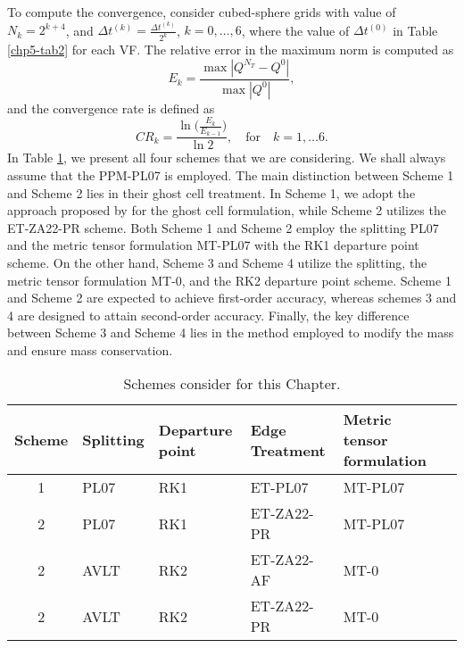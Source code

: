 To compute the convergence, consider cubed-sphere grids with value of $N_k =  2^{k+4}$,
and $\Delta t^{(k)} = \frac{\Delta t^{(k)}}{2^k}$, $k=0, \ldots, 6$, where
the value of $\Delta t^{(0)}$ in Table \ref{chp5-tab2} for each VF.
The relative error in the maximum norm is computed as
\begin{equation}
	E_k = \frac{\max |Q^{N_T} - Q^0|}{\max {|Q^0|}},
\end{equation}
and the convergence rate is defined as
\begin{equation*}
	CR_k = \frac{\ln{\bigg(\frac{E_{k}}{E_{k-1}}}\bigg)}{\ln 2}, \quad \text{for} \quad k = 1, \ldots 6.
\end{equation*}
In Table \ref{chp5-tab3}, we present all four schemes that we are considering. 
We shall always assume that the PPM-PL07 is employed. 
The main distinction between Scheme 1 and Scheme 2 lies in their ghost cell treatment.
In Scheme 1, we adopt the approach proposed by \citet{putman:2007} for the ghost cell formulation,
while Scheme 2 utilizes the ET-ZA22-PR scheme.
Both Scheme 1 and Scheme 2 employ the splitting PL07 and the metric tensor formulation MT-PL07 
with the RK1 departure point scheme. On the other hand, Scheme 3 and Scheme 4 utilize the splitting,
the metric tensor formulation MT-0, and the RK2 departure point scheme.
Scheme 1 and Scheme 2 are expected to achieve first-order accuracy, whereas schemes 3 and 4 are designed
to attain second-order accuracy. Finally, the key difference between Scheme 3 and Scheme 4 lies in the method employed to modify the mass and ensure mass conservation.
\begin{table}[!ht]
	\begin{tabular}{|c|l|l|l|l|l|}
		\hline
		Scheme & Splitting & Departure point & Edge Treatment & Metric tensor formulation\\ \hline
		1   & PL07 & RK1 & ET-PL07 & MT-PL07\\ \hline
		2   & PL07 & RK1 & ET-ZA22-PR & MT-PL07\\ \hline
		2   & AVLT & RK2 & ET-ZA22-AF & MT-0\\ \hline
		2   & AVLT & RK2 & ET-ZA22-PR & MT-0\\ \hline
	\end{tabular}
	\caption{Schemes consider for this Chapter.}
	\label{chp5-tab3} 
\end{table}

